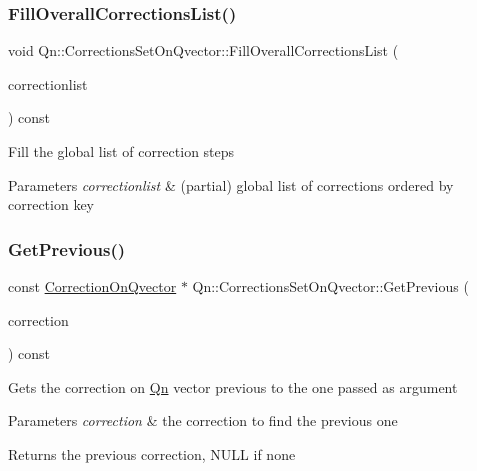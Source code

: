 \subsubsection{\texorpdfstring{Fill\+Overall\+Corrections\+List()}{FillOverallCorrectionsList()}}
{\footnotesize\ttfamily void Qn\+::\+Corrections\+Set\+On\+Qvector\+::\+Fill\+Overall\+Corrections\+List (\begin{DoxyParamCaption}\item[{T\+List $\ast$}]{correctionlist }\end{DoxyParamCaption}) const}

Fill the global list of correction steps 
\begin{DoxyParams}{Parameters}
{\em correctionlist} & (partial) global list of corrections ordered by correction key \\
\hline
\end{DoxyParams}
\mbox{\label{classQn_1_1CorrectionsSetOnQvector_ade101be45b400b1b34f253eed75ccf9f}} 
\subsubsection{\texorpdfstring{Get\+Previous()}{GetPrevious()}}
{\footnotesize\ttfamily const \mbox{\hyperlink{classQn_1_1CorrectionOnQvector}{Correction\+On\+Qvector}} $\ast$ Qn\+::\+Corrections\+Set\+On\+Qvector\+::\+Get\+Previous (\begin{DoxyParamCaption}\item[{const \mbox{\hyperlink{classQn_1_1CorrectionOnQvector}{Correction\+On\+Qvector}} $\ast$}]{correction }\end{DoxyParamCaption}) const}

Gets the correction on \mbox{\hyperlink{namespaceQn}{Qn}} vector previous to the one passed as argument 
\begin{DoxyParams}{Parameters}
{\em correction} & the correction to find the previous one \\
\hline
\end{DoxyParams}
\begin{DoxyReturn}{Returns}
the previous correction, N\+U\+LL if none 
\end{DoxyReturn}
\mbox{\label{classQn_1_1CorrectionsSetOnQvector_a5b434f22965975e0131ec0938afcf665}} 
